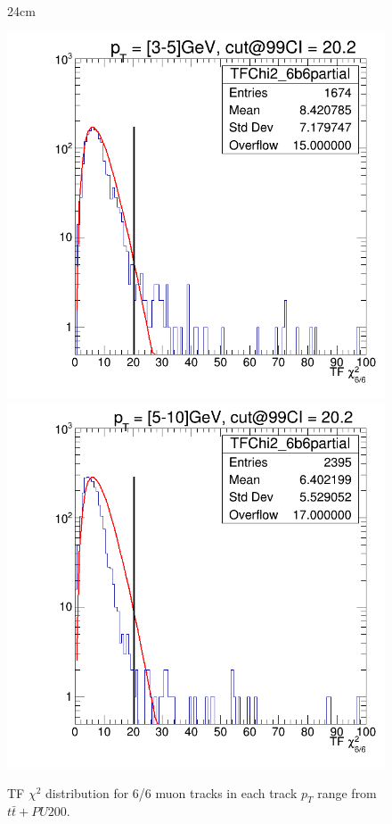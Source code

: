 \begin{landscape}
\begin{figure}[htbp]{24cm}
	\caption{TF $\chi^{2}$ distribution for 6/6 muon tracks in each track $p_{T}$ range from $t\bar{t}+PU200$.}
	\includegraphics[scale=0.25,trim={1cm 0cm 1cm 0cm},clip]{AppendixCMSL1TT/figs/chi2_6b6_3to5_99cut}
	\includegraphics[scale=0.25,trim={1cm 0cm 1cm 0cm},clip]{AppendixCMSL1TT/figs/chi2_6b6_5to10_99cut}	

\end{figure}
\end{landscape}
